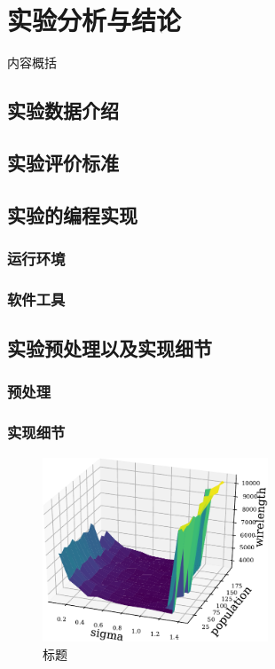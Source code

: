 \chapter{实验分析与结论}

内容概括\cite{Zuo10}



\section{实验数据介绍}




\section{实验评价标准}





\section{实验的编程实现}


\subsection{运行环境}


\subsection{软件工具}






\section{实验预处理以及实现细节}

\subsection{预处理}



\subsection{实现细节}

\begin{figure}[h]
	\centering
	\includegraphics[width=0.6\textwidth]{figure/cma_sensitivity-crop}
	\caption{标题} 
	\label{fig:objective}
\end{figure}

